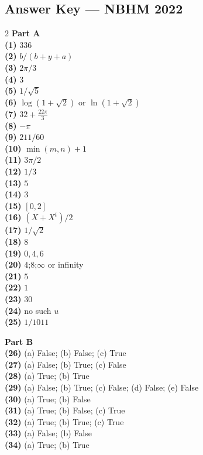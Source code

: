 \documentclass[11pt,a4paper]{article}
\newcommand{\examsec}[1]{%
  \subsection*{#1}
  \vspace{-2pt}
}
\begin{document}
\examsec{Answer Key --- NBHM 2022}
\begin{multicols}{2}
\textbf{Part A}\\
\textbf{(1)} $336$\\
\textbf{(2)} $b/(b + y + a)$\\
\textbf{(3)} $2\pi/3$\\
\textbf{(4)} $3$\\
\textbf{(5)} $1/\sqrt{5}$\\
\textbf{(6)} $\log(1 + \sqrt{2})$ or $\ln(1 + \sqrt{2})$\\
\textbf{(7)} $32 + \frac{22\pi}{3}$\\
\textbf{(8)} $-\pi$\\
\textbf{(9)} $211/60$\\
\textbf{(10)} $\min(m, n) + 1$\\
\textbf{(11)} $3\pi/2$\\
\textbf{(12)} $1/3$\\
\textbf{(13)} $5$\\
\textbf{(14)} $3$\\
\textbf{(15)} $[0, 2]$\\
\textbf{(16)} $(X + X^t)/2$\\
\textbf{(17)} $1/\sqrt{2}$\\
\textbf{(18)} $8$\\
\textbf{(19)} $0, 4, 6$\\
\textbf{(20)} $4$;\quad $8$;\quad $\infty$ or infinity\\
\textbf{(21)} $5$\\
\textbf{(22)} $1$\\
\textbf{(23)} $30$\\
\textbf{(24)} no such $u$\\
\textbf{(25)} $1/1011$

\medskip
\textbf{Part B}\\
\textbf{(26)} (a) False; (b) False; (c) True\\
\textbf{(27)} (a) False; (b) True; (c) False\\
\textbf{(28)} (a) True; (b) True\\
\textbf{(29)} (a) False; (b) True; (c) False; (d) False; (e) False\\
\textbf{(30)} (a) True; (b) False\\
\textbf{(31)} (a) True; (b) False; (c) True\\
\textbf{(32)} (a) True; (b) True; (c) True\\
\textbf{(33)} (a) False; (b) False\\
\textbf{(34)} (a) True; (b) True
\end{multicols}
\end{document}
